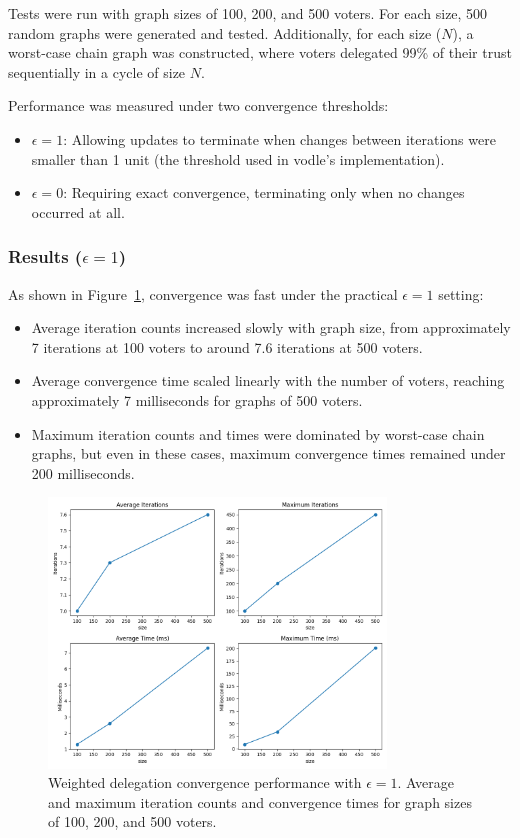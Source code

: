 Tests were run with graph sizes of 100, 200, and 500 voters. For each size, 500 random graphs were generated and tested. Additionally, for each size ($N$), a worst-case chain graph was constructed, where voters delegated 99\% of their trust sequentially in a cycle of size $N$.

Performance was measured under two convergence thresholds:
\begin{itemize}
    \item \textbf{$\epsilon = 1$}: Allowing updates to terminate when changes between iterations were smaller than 1 unit (the threshold used in vodle's implementation).
    \item \textbf{$\epsilon = 0$}: Requiring exact convergence, terminating only when no changes occurred at all.
\end{itemize}

\subsubsection*{Results ($\epsilon = 1$)}

As shown in Figure~\ref{fig:e1_perf}, convergence was fast under the practical $\epsilon = 1$ setting:
\begin{itemize}
    \item Average iteration counts increased slowly with graph size, from approximately 7 iterations at 100 voters to around 7.6 iterations at 500 voters.
    \item Average convergence time scaled linearly with the number of voters, reaching approximately 7 milliseconds for graphs of 500 voters.
    \item Maximum iteration counts and times were dominated by worst-case chain graphs, but even in these cases, maximum convergence times remained under 200 milliseconds.
\end{itemize}

\begin{figure}[H]
    \centering
    \includegraphics[width=0.8\textwidth]{../common/perf_graphs/e_1.png}
    \caption{Weighted delegation convergence performance with $\epsilon = 1$. Average and maximum iteration counts and convergence times for graph sizes of 100, 200, and 500 voters.}
    \label{fig:e1_perf}
\end{figure}

